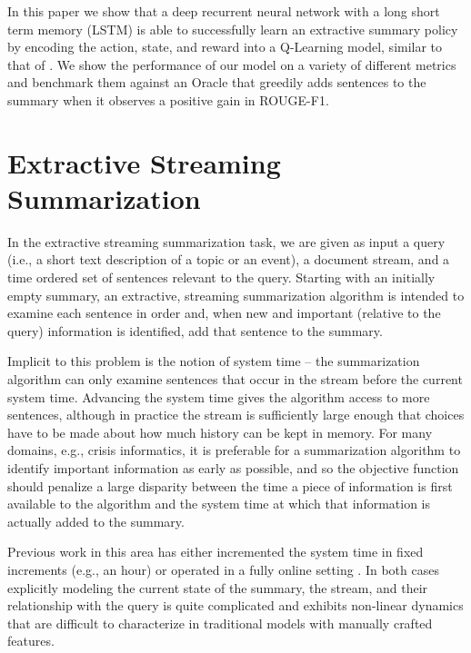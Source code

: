 \documentclass[12pt]{article}
\begin{document}
In this paper we show that a deep recurrent neural network with a long short term memory (LSTM) \cite{hochreiter1997long} is able to successfully learn an extractive summary policy by encoding the action, state, and reward into a Q-Learning model, similar to that of  \cite{hausknecht2015deep}. We show the performance of our model on a variety of different metrics and benchmark them against an Oracle that greedily adds sentences to the summary when it observes a positive gain in ROUGE-F1.

\section{Extractive Streaming Summarization}

In the extractive streaming summarization task, we are given as input a query (i.e., a short text description of a topic or an event), a document stream, and a time ordered set of sentences relevant to the query. Starting with an initially empty summary,  an extractive, streaming summarization algorithm is intended to examine each sentence in order and, when new and important (relative to the query) information is identified, add that sentence to the summary. 

Implicit to this problem is the notion of system time -- the summarization algorithm can only examine sentences that occur in the stream before the current system time. Advancing the system time gives the algorithm access to more sentences, although in practice the stream is sufficiently large enough that choices have to be made about how much history can be kept in memory. For many domains, e.g., crisis informatics, it is preferable for a summarization algorithm to identify important information as early as possible, and so the objective function should penalize a large disparity between the time a piece of information is first available to the algorithm and the system time at which that information is actually added to the summary.

Previous work in this area has either incremented the system time in fixed increments (e.g., an hour)  \cite{mccreadie2014incremental, kedzie2015predicting} or operated in a fully online setting \cite{guo2013updating,kedzie2016real}. In both cases explicitly modeling the current state of the summary, the stream, and their relationship with the query is quite complicated and exhibits non-linear dynamics that are difficult to characterize in traditional models with manually crafted features.
\end{document}
